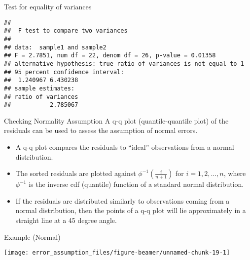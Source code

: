 \begin{frame}[fragile]{Test for equality of variances}
\protect\hypertarget{test-for-equality-of-variances}{}
\begin{Shaded}
\begin{Highlighting}[]
\StringTok{ }\NormalTok{(lmod)[savings}\OperatorTok{$}\OperatorTok{\textgreater{}}\NormalTok{]}
\StringTok{ }\NormalTok{(lmod)[savings}\OperatorTok{$}\OperatorTok{\textless{}}\NormalTok{]}
\end{Highlighting}
\end{Shaded}

\begin{verbatim}
## 
##  F test to compare two variances
## 
## data:  sample1 and sample2
## F = 2.7851, num df = 22, denom df = 26, p-value = 0.01358
## alternative hypothesis: true ratio of variances is not equal to 1
## 95 percent confidence interval:
##  1.240967 6.430238
## sample estimates:
## ratio of variances 
##           2.785067
\end{verbatim}
\end{frame}

\begin{frame}{Checking Normality Assumption}
\protect\hypertarget{checking-normality-assumption}{}
A q-q plot (quantile-quantile plot) of the residuals can be used to
assess the assumption of normal errors.

\begin{itemize}
\item
  A q-q plot compares the residuals to ``ideal'' observations from a
  normal distribution.
\item
  The sorted residuals are plotted against
  \(\phi^{-1}\left(\frac{i}{n+1}\right)\) for \(i=1,2,\dots ,n\), where
  \(\phi^{-1}\) is the inverse cdf (quantile) function of a standard
  normal distribution.
\item
  If the residuals are distributed similarly to observations coming from
  a normal distribution, then the points of a q-q plot will lie
  approximately in a straight line at a 45 degree angle.
\end{itemize}
\end{frame}

\begin{frame}{Example (Normal)}
\protect\hypertarget{example-normal}{}
\begin{center}\texttt{[image: error\_assumption\_files/figure-beamer/unnamed-chunk-19-1]} \end{center}
\end{frame}

